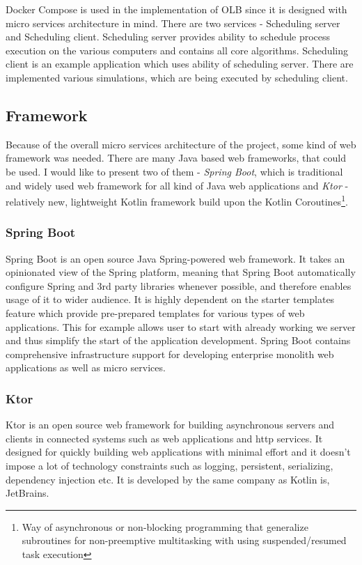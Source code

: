 Docker Compose is used in the implementation of OLB since it is designed with micro services architecture in mind.
There are two services - Scheduling server and Scheduling client.
Scheduling server provides ability to schedule process execution on the various computers
and contains all core algorithms.
Scheduling client is an example application which uses ability of scheduling server. 
There are implemented various simulations,
which are being executed by scheduling client.  

\subsection{Framework}
Because of the overall micro services architecture of the project,
some kind of web framework was needed.
There are many Java based web frameworks,
that could be used. 
I would like to present two of them - \textit{Spring Boot}, 
which is traditional and widely used web framework for all kind of Java web applications
and \textit{Ktor} - relatively new, 
lightweight Kotlin framework build upon the Kotlin Coroutines\footnote{Way of asynchronous or non-blocking programming
that generalize subroutines for non-preemptive multitasking with using suspended/resumed task execution}.


\subsubsection{Spring Boot}
Spring Boot\cite{springBootReference} is an open source Java Spring-powered web framework.
It takes an opinionated view of the Spring platform,
meaning that Spring Boot automatically configure Spring and 3rd party libraries whenever possible,
and therefore enables usage of it to wider audience.
It is highly dependent on the starter templates feature which provide pre-prepared templates for various types of web applications.
This for example allows user to start with already working we server
and thus simplify the start of the application development\cite{springBootGithubReference}.
Spring Boot contains comprehensive infrastructure support for developing enterprise monolith web applications as well as micro services\cite{springBootGithubReference}.

\subsubsection{Ktor}
Ktor\cite{ktorWebPage} is an open source web framework for building asynchronous servers 
and clients in connected systems such as web applications and http services.
It designed for quickly building web applications with minimal effort 
and it doesn't impose a lot of technology constraints such as logging, persistent, serializing, dependency injection etc.\cite{ktorApiReference}
It is developed by the same company as Kotlin is, JetBrains.



